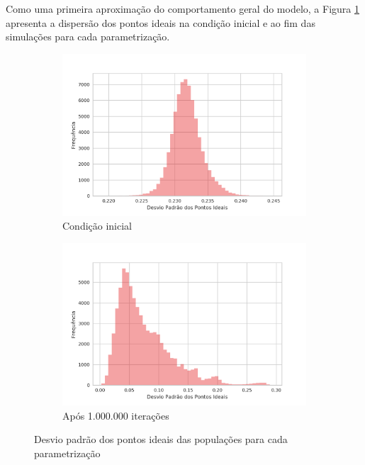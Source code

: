 Como uma primeira aproximação do comportamento geral do modelo, a Figura
\ref{fig:hists1} apresenta a dispersão dos pontos ideais na condição inicial e
ao fim das simulações para cada parametrização.

\begin{figure}[h]
    \centering
    \begin{subfigure}[b]{0.49\textwidth}
      \includegraphics[width=\textwidth]{ims/diststdinit.png}
      \caption{Condição inicial}
    \end{subfigure}
    \begin{subfigure}[b]{0.49\textwidth}
      \includegraphics[width=\textwidth]{ims/distY.png}
       \caption{Após 1.000.000 iterações}
      \end{subfigure}
      \caption{Desvio padrão dos pontos ideais das populações para cada
        parametrização}
      \label{fig:hists1}
    \end{figure}
    

